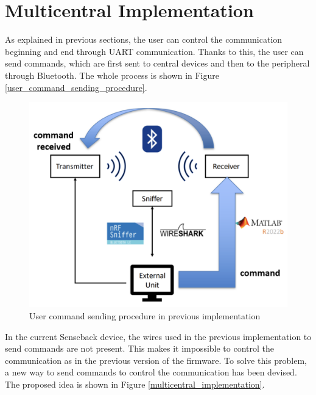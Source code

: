 \documentclass{Configuration_Files/PoliMi3i_thesis}
\begin{document}
\section{Multicentral Implementation}
As explained in previous sections, the user can control the communication beginning and end through UART communication. Thanks to this, the user can send commands, which are first sent to central devices and then to the peripheral through Bluetooth. The whole process is shown in Figure \ref{user_command_sending_procedure}.

\begin{figure}[H]
    \centering
    \includegraphics[scale=0.5]{Multicentral/1.png}
    \caption{User command sending procedure in previous implementation}
    \label{multicentral_1}
\end{figure}

In the current Senseback device, the wires used in the previous implementation to send commands are not present. This makes it impossible to control the communication as in the previous version of the firmware. To solve this problem, a new way to send commands to control the communication has been devised. The proposed idea is shown in Figure \ref{multicentral_implementation}.
\end{document}
